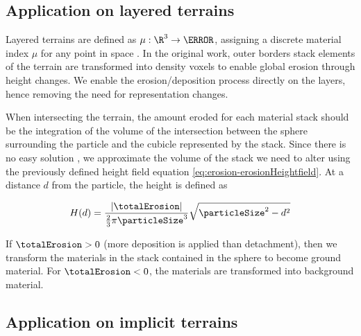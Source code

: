 


\subsection{Application on layered terrains}
\label{sec:erosion-application_on_layers}

Layered terrains are defined as $\mu: \R^3 \to \N$, assigning a discrete material index $\mu$ for any point in space \cite{Benes2001, Peytavie2009b}. In the original work, outer borders stack elements of the terrain are transformed into density voxels to enable global erosion through height changes. We enable the erosion/deposition process directly on the layers, hence removing the need for representation changes.

When intersecting the terrain, the amount eroded for each material stack should be the integration of the volume of the intersection between the sphere surrounding the particle and the cubicle represented by the stack. Since there is no easy solution \cite{Jones2017}, we approximate the volume of the stack we need to alter using the previously defined height field equation \eqref{eq:erosion-erosionHeightfield}.  
At a distance $d$ from the particle, the height is defined as

\begin{align}
    \label{eq:erosion-erosionLayers}
    H(d) = \frac{|\totalErosion|}{\frac{2}{3} \pi \particleSize^3} \sqrt{\particleSize^2 - d^2}
\end{align}

If $\totalErosion > 0$ (more deposition is applied than detachment), then we transform the materials in the stack contained in the sphere to become ground material. For $\totalErosion < 0$, the materials are transformed into background material.

\subsection{Application on implicit terrains}
\label{sec:erosion-application_on_implicit}


